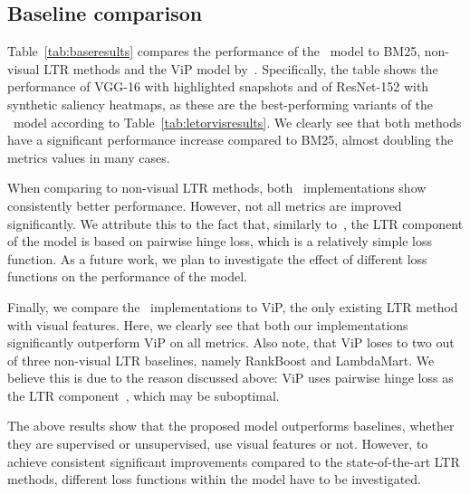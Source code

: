 \subsection{Baseline comparison}
Table~\ref{tab:baseresults} compares the performance of the \modelname~model to BM25, non-visual \ac{LTR} methods and the ViP model by~\citet{fan2017learning}. 
Specifically, the table shows the performance of VGG-16 with highlighted snapshots and of ResNet-152 with synthetic saliency heatmaps, as these are the best-performing variants of the \modelname~model according to Table~\ref{tab:letorvisresults}.
We clearly see that both methods have a significant performance increase compared to BM25, almost doubling the metrics values in many cases.

When comparing to non-visual \ac{LTR} methods, both \modelname~implementations show consistently better performance.
However, not all metrics are improved significantly.
We attribute this to the fact that, similarly to~\cite{fan2017learning}, the \ac{LTR} component of the \modelname{} model is based on pairwise hinge loss, which is a relatively simple loss function.
As a future work, we plan to investigate the effect of different loss functions on the performance of the \modelname{} model.

Finally, we compare the \modelname~implementations to ViP, the only existing \ac{LTR} method with visual features.
Here, we clearly see that both our implementations significantly outperform ViP on all metrics.
Also note, that ViP loses to two out of three non-visual \ac{LTR} baselines, namely RankBoost and LambdaMart.
We believe this is due to the reason discussed above: ViP uses pairwise hinge loss as the \ac{LTR} component~\cite{fan2017learning}, which may be suboptimal.

The above results show that the proposed \modelname{} model outperforms baselines, whether they are supervised or unsupervised, use visual features or not.
However, to achieve consistent significant improvements compared to the state-of-the-art \ac{LTR} methods, different loss functions within the \modelname{} model have to be investigated.


